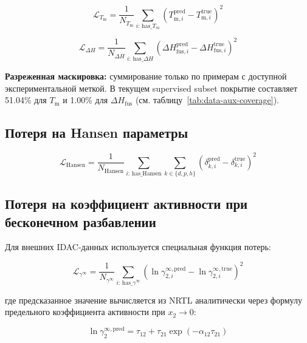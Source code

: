 \documentclass[11pt]{article}
\begin{document}
\begin{equation*}
\mathcal{L}_{T_{\mathrm{m}}} = \frac{1}{N_{T_{\mathrm{m}}}} \sum_{i:\, \mathrm{has}\_T_m} \left(T_{\mathrm{m},i}^{\mathrm{pred}} - T_{\mathrm{m},i}^{\mathrm{true}}\right)^2
\end{equation*}

\begin{equation*}
\mathcal{L}_{\Delta H} = \frac{1}{N_{\Delta H}} \sum_{i:\, \mathrm{has}\_\Delta H} \left(\Delta H_{\mathrm{fus},i}^{\mathrm{pred}} - \Delta H_{\mathrm{fus},i}^{\mathrm{true}}\right)^2
\end{equation*}

\textbf{Разреженная маскировка:} суммирование только по примерам с доступной экспериментальной меткой. В текущем supervised subset покрытие составляет 51.04\% для $T_{\mathrm{m}}$ и 1.00\% для $\Delta H_{\mathrm{fus}}$ (см. таблицу~\ref{tab:data-aux-coverage}).

\subsection{Потеря на Hansen параметры}

\begin{equation*}
\mathcal{L}_{\mathrm{Hansen}} = \frac{1}{N_{\mathrm{Hansen}}} \sum_{i:\, \mathrm{has}\_\mathrm{Hansen}} \sum_{k \in \{d, p, h\}} \left(\delta_{k,i}^{\mathrm{pred}} - \delta_{k,i}^{\mathrm{true}}\right)^2
\end{equation*}

\subsection{Потеря на коэффициент активности при бесконечном разбавлении}

Для внешних IDAC-данных используется специальная функция потерь:

\begin{equation*}
\mathcal{L}_{\gamma^\infty} = \frac{1}{N_{\gamma^\infty}} \sum_{i:\, \mathrm{has}\_\gamma^\infty} \left(\ln\gamma_{2,i}^{\infty,\mathrm{pred}} - \ln\gamma_{2,i}^{\infty,\mathrm{true}}\right)^2
\end{equation*}

где предсказанное значение вычисляется из NRTL аналитически через формулу предельного коэффициента активности при $x_2\to 0$:

\begin{equation*}
\ln\gamma_2^{\infty,\mathrm{pred}} = \tau_{12} + \tau_{21}\exp(-\alpha_{12}\tau_{21})
\end{equation*}
\end{document}
